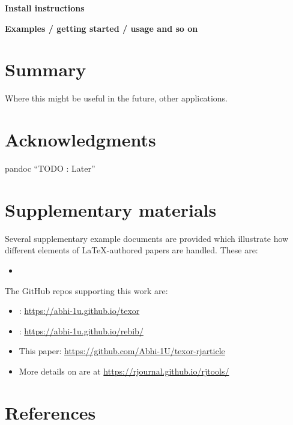 \textbf{Install instructions}

\textbf{Examples / getting started / usage and so on}

\hypertarget{summary}{%
\section{Summary}\label{summary}}

Where this might be useful in the future, other applications.

\hypertarget{acknowledgments}{%
\section{Acknowledgments}\label{acknowledgments}}

pandoc
``TODO : Later''

\hypertarget{supplementary-materials}{%
\section{Supplementary materials}\label{supplementary-materials}}

Several supplementary example documents are provided which illustrate how different elements of LaTeX-authored papers are handled. These are:

\begin{itemize}
\tightlist
\item
\end{itemize}

The GitHub repos supporting this work are:

\begin{itemize}
\tightlist
\item
  : \url{https://abhi-1u.github.io/texor}
\item
  : \url{https://abhi-1u.github.io/rebib/}
\item
  This paper: \url{https://github.com/Abhi-1U/texor-rjarticle}
\item
  More details on  are at \url{https://rjournal.github.io/rjtools/}
\end{itemize}

\hypertarget{references}{%
\section*{References}\label{references}}

